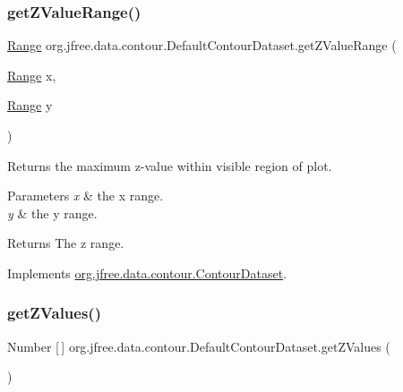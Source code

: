 \subsubsection{\texorpdfstring{get\+Z\+Value\+Range()}{getZValueRange()}}
{\footnotesize\ttfamily \mbox{\hyperlink{classorg_1_1jfree_1_1data_1_1_range}{Range}} org.\+jfree.\+data.\+contour.\+Default\+Contour\+Dataset.\+get\+Z\+Value\+Range (\begin{DoxyParamCaption}\item[{\mbox{\hyperlink{classorg_1_1jfree_1_1data_1_1_range}{Range}}}]{x,  }\item[{\mbox{\hyperlink{classorg_1_1jfree_1_1data_1_1_range}{Range}}}]{y }\end{DoxyParamCaption})}

Returns the maximum z-\/value within visible region of plot.


\begin{DoxyParams}{Parameters}
{\em x} & the x range. \\
\hline
{\em y} & the y range.\\
\hline
\end{DoxyParams}
\begin{DoxyReturn}{Returns}
The z range. 
\end{DoxyReturn}


Implements \mbox{\hyperlink{interfaceorg_1_1jfree_1_1data_1_1contour_1_1_contour_dataset_a3a85edeb7c32dc8188b1d4fe945bb542}{org.\+jfree.\+data.\+contour.\+Contour\+Dataset}}.

\mbox{\label{classorg_1_1jfree_1_1data_1_1contour_1_1_default_contour_dataset_aeab7352c99dfe7e6ebff00064e8d7ce0}} 
\subsubsection{\texorpdfstring{get\+Z\+Values()}{getZValues()}}
{\footnotesize\ttfamily Number \mbox{[}$\,$\mbox{]} org.\+jfree.\+data.\+contour.\+Default\+Contour\+Dataset.\+get\+Z\+Values (\begin{DoxyParamCaption}{ }\end{DoxyParamCaption})}

